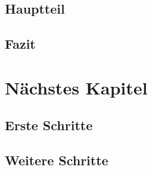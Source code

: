 \documentclass[a4paper]{book} %
\begin{document}
        \section{Hauptteil}
            \blindtext
        \section{Fazit}
    \chapter{Nächstes Kapitel}
        \section{Erste Schritte}
            \blindmathpaper
        \section{Weitere Schritte}
            \blindtext
\end{document}
